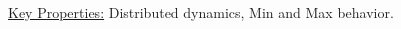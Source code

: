 \documentclass[	hyperref={pdfpagelabels=false}, xcolor=dvipsnames,
		11pt]{beamer}
\begin{document}
\begin{frame}
\begin{columns}
\begin{column}{5cm}
\begin{overprint}
{\begin{minipage}[t]{5 cm}
\begin{figure}[h]
\begin{center}
		\end{center}
	\end{figure}
	\end{minipage} }

	\end{overprint}
	\end{column}
	\end{columns}

	\begin{alertblock}{\underline{Key Properties:}}
		Distributed dynamics, Min and Max behavior.
	\end{alertblock}
\end{frame}
\end{document}
